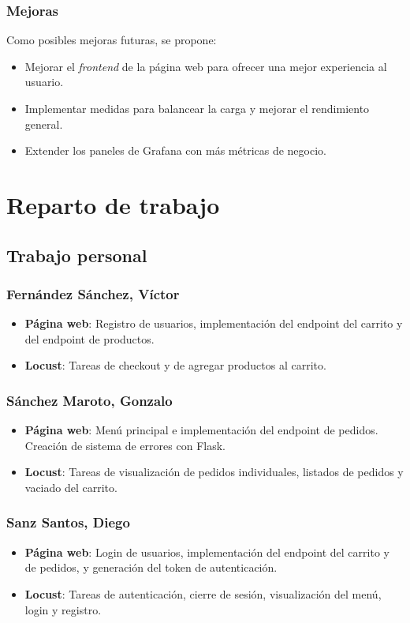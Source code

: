 \documentclass[10pt]{book}
\begin{document}
\subsubsection*{Mejoras}
Como posibles mejoras futuras, se propone:
\begin{itemize}
    \item Mejorar el \textit{frontend} de la página web para ofrecer una mejor experiencia al usuario.
    \item Implementar medidas para balancear la carga y mejorar el rendimiento general.
    \item Extender los paneles de Grafana con más métricas de negocio.
\end{itemize}


\section{Reparto de trabajo}

\subsection{Trabajo personal}

\subsubsection*{Fernández Sánchez, Víctor}
\begin{itemize}
    \item \textbf{Página web}: Registro de usuarios, implementación del endpoint del carrito y del endpoint de productos.
    \item \textbf{Locust}: Tareas de checkout y de agregar productos al carrito.
\end{itemize}

\subsubsection*{Sánchez Maroto, Gonzalo}
\begin{itemize}
    \item \textbf{Página web}: Menú principal e implementación del endpoint de pedidos. Creación de sistema de errores con Flask.
    \item \textbf{Locust}: Tareas de visualización de pedidos individuales, listados de pedidos y vaciado del carrito.
\end{itemize}

\subsubsection*{Sanz Santos, Diego}
\begin{itemize}
    \item \textbf{Página web}: Login de usuarios, implementación del endpoint del carrito y de pedidos, y generación del token de autenticación.
    \item \textbf{Locust}: Tareas de autenticación, cierre de sesión, visualización del menú, login y registro.
\end{itemize}
\end{document}
